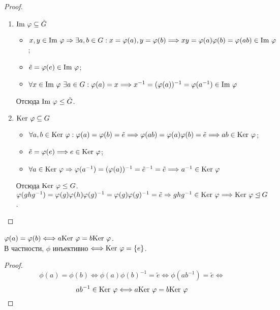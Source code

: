 \begin{proof}\tab
    \begin{enumerate}
        \item $\textup{Im }\phi \subseteq \tilde{G}$
        \begin{itemize}
            \item $x, y \in \textup{Im }\phi \Rightarrow \exists a, b \in G: x = \phi(a), y = \phi(b) \Longrightarrow xy = \phi(a)\phi(b) = \phi(ab) \in \textup{Im }\phi$;
            \item $\tilde{e} = \phi(e) \in \textup{Im }\phi$;
            \item $\forall x \in \textup{Im }\phi \ \exists a \in G: \phi(a) = x \Longrightarrow x^{-1} = (\phi(a))^{-1}= \phi(a^{-1}) \in \textup{Im }\phi$
        \end{itemize}
        Отсюда $\textup{Im } \phi \leq \tilde{G}$.
        \item $\textup{Ker }\phi \subseteq G$
        \begin{itemize}
            \item $\forall a, b \in \textup{Ker }\phi: \phi(a) = \phi(b) = \tilde{e} \Longrightarrow \phi(ab) = \phi(a)\phi(b) = \tilde{e} \Longrightarrow \newline ab \in \textup{Ker }\phi$;
            \item $\tilde{e} = \phi(e) \Longrightarrow e \in \textup{Ker }\phi$;
            \item $\forall a \in \textup{Ker }\phi \Rightarrow \phi(a^{-1}) = (\phi(a))^{-1} = \tilde{e}^{-1} = \tilde{e}  \Longrightarrow a^{-1} \in \textup{Ker }\phi$
        \end{itemize}
        Отсюда $\textup{Ker } \phi \leq G$.\\
        $\phi(ghg^{-1}) = \phi(g)\phi(h)\phi(g)^{-1} = \phi(g)\phi(g)^{-1} = \tilde{e} \Rightarrow ghg^{-1} \in \textup{Ker }\phi \Longrightarrow \textup{Ker }\phi \unlhd G$.
    \end{enumerate}
\end{proof}
\begin{subtheoremnum}
    $\phi(a) = \phi(b) \Longleftrightarrow a \textup{Ker }\phi = b \textup{Ker }\phi$.\\
    В частности, $\phi$ инъективно $\Longleftrightarrow \textup{Ker }\phi = \{e\}$. 
\end{subtheoremnum}
\begin{proof}
    \[\phi(a) = \phi(b) \Longleftrightarrow \phi(a)\phi(b)^{-1} = \tilde{e} \Longleftrightarrow \phi(ab^{-1}) = \tilde{e} \Longleftrightarrow\]
    \[ab^{-1} \in \textup{Ker }\phi \Longleftrightarrow a \textup{Ker }\phi = b \textup{Ker }\phi\]
\end{proof}
